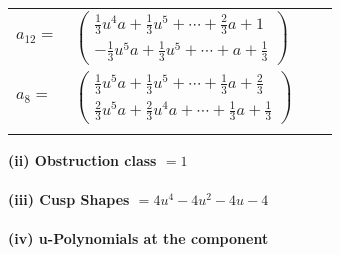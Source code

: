 \documentclass[1p]{elsarticle_modified}
\theoremstyle{definition}
\begin{document}
\begin{tabular}{m{7pt} m{180pt} m{7pt} m{180pt} }
\flushright $a_{12}=$&$\begin{pmatrix}\frac{1}{3} u^4 a+\frac{1}{3} u^5+\cdots+\frac{2}{3} a+1\\-\frac{1}{3} u^5 a+\frac{1}{3} u^5+\cdots+a+\frac{1}{3}\end{pmatrix}$ \\
\flushright $a_{8}=$&$\begin{pmatrix}\frac{1}{3} u^5 a+\frac{1}{3} u^5+\cdots+\frac{1}{3} a+\frac{2}{3}\\\frac{2}{3} u^5 a+\frac{2}{3} u^4 a+\cdots+\frac{1}{3} a+\frac{1}{3}\end{pmatrix}$\\&\end{tabular}
\flushleft \textbf{(ii) Obstruction class $= 1$}\\~\\
\flushleft \textbf{(iii) Cusp Shapes $= 4 u^4-4 u^2-4 u-4$}\\~\\
\newpage\renewcommand{\arraystretch}{1}
\flushleft \textbf{(iv) u-Polynomials at the component}\newline \\
\end{document}

